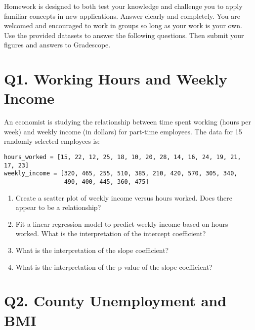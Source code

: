 \documentclass[12pt]{article}
\begin{document}
Homework is designed to both test your knowledge and challenge you to apply familiar concepts in new applications. Answer clearly and completely. You are welcomed and encouraged to work in groups so long as your work is your own. Use the provided datasets to answer the following questions. Then submit your figures and answers to Gradescope.

\section*{Q1. Working Hours and Weekly Income}

An economist is studying the relationship between time spent working (hours per week) and weekly income (in dollars) for part-time employees. The data for 15 randomly selected employees is:

\begin{verbatim}
hours_worked = [15, 22, 12, 25, 18, 10, 20, 28, 14, 16, 24, 19, 21, 17, 23]
weekly_income = [320, 465, 255, 510, 385, 210, 420, 570, 305, 340, 
                 490, 400, 445, 360, 475]
\end{verbatim}

\begin{enumerate}[label=\alph*)]
    \item Create a scatter plot of weekly income versus hours worked. Does there appear to be a relationship?
    
    \vspace{3cm}
    
    \item Fit a linear regression model to predict weekly income based on hours worked. What is the interpretation of the intercept coefficient?
    
    \vspace{3cm}
    
    \item What is the interpretation of the slope coefficient?
    
    \vspace{3cm}
    
    \item What is the interpretation of the p-value of the slope coefficient?
    
    \vspace{3cm}
\end{enumerate}

\section*{Q2. County Unemployment and BMI}
\end{document}
